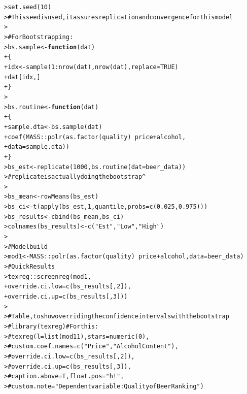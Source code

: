 \documentclass[12pt]{article}\usepackage[]{graphicx}\usepackage[]{color}
\makeatletter
\newcommand{\hlnum}[1]{\textcolor[rgb]{0.82,0.78,0.62}{#1}}%
\newcommand{\hlstr}[1]{\textcolor[rgb]{0.82,0.78,0.62}{#1}}%
\newcommand{\hlcom}[1]{\textcolor[rgb]{0.404,0.408,0.42}{#1}}%
\newcommand{\hlopt}[1]{\textcolor[rgb]{0.882,0.878,0.898}{#1}}%
\newcommand{\hlstd}[1]{\textcolor[rgb]{0.882,0.878,0.898}{#1}}%
\newcommand{\hlkwa}[1]{\textcolor[rgb]{0.384,0.675,0.808}{\textbf{#1}}}%
\newcommand{\hlkwb}[1]{\textcolor[rgb]{0.902,0.675,0.196}{#1}}%
\newcommand{\hlkwc}[1]{\textcolor[rgb]{0.812,0.522,0.388}{#1}}%
\newcommand{\hlkwd}[1]{\textcolor[rgb]{0.733,0.388,0.812}{#1}}%
\newenvironment{kframe}{%
 \def\at@end@of@kframe{}%
 \ifinner\ifhmode%
  \def\at@end@of@kframe{\end{minipage}}%
  \begin{minipage}{\columnwidth}%
 \fi\fi%
 \def\FrameCommand##1{\hskip\@totalleftmargin \hskip-\fboxsep
 \colorbox{shadecolor}{##1}\hskip-\fboxsep
     \hskip-\linewidth \hskip-\@totalleftmargin \hskip\columnwidth}%
 \MakeFramed {\advance\hsize-\width
   \@totalleftmargin\z@ \linewidth\hsize
   \@setminipage}}%
 {\par\unskip\endMakeFramed%
 \at@end@of@kframe}
\newenvironment{knitrout}{}{} %
\makeatother
\begin{document}
\begin{flushleft}
\begin{knitrout}
\color{fgcolor}\begin{kframe}
\begin{alltt}
\hlstd{> }\hlkwd{set.seed}\hlstd{(}\hlnum{10}\hlstd{)}
\hlstd{> }\hlcom{# This seed is used, it assures replication and convergence for this model}
\hlstd{> }
\hlstd{> }\hlcom{# For Bootstrapping:}
\hlstd{> }\hlstd{bs.sample} \hlkwb{<-} \hlkwa{function}\hlstd{(}\hlkwc{dat}\hlstd{)}
\hlstd{+ }\hlstd{\{}
\hlstd{+ }  \hlstd{idx} \hlkwb{<-} \hlkwd{sample}\hlstd{(}\hlnum{1}\hlopt{:}\hlkwd{nrow}\hlstd{(dat),} \hlkwd{nrow}\hlstd{(dat),} \hlkwc{replace} \hlstd{=} \hlnum{TRUE}\hlstd{)}
\hlstd{+ }  \hlstd{dat[idx,]}
\hlstd{+ }\hlstd{\}}
\hlstd{> }
\hlstd{> }\hlstd{bs.routine} \hlkwb{<-} \hlkwa{function}\hlstd{(}\hlkwc{dat}\hlstd{)}
\hlstd{+ }\hlstd{\{}
\hlstd{+ }  \hlstd{sample.dta} \hlkwb{<-} \hlkwd{bs.sample}\hlstd{(dat)}
\hlstd{+ }  \hlkwd{coef}\hlstd{(MASS}\hlopt{::}\hlkwd{polr}\hlstd{(}\hlkwd{as.factor}\hlstd{(quality)} \hlopt{~} \hlstd{price} \hlopt{+} \hlstd{alcohol,}
\hlstd{+ }                  \hlkwc{data} \hlstd{= sample.dta))}
\hlstd{+ }\hlstd{\}}
\hlstd{> }\hlstd{bs_est} \hlkwb{<-} \hlkwd{replicate}\hlstd{(}\hlnum{1000}\hlstd{,} \hlkwd{bs.routine}\hlstd{(}\hlkwc{dat} \hlstd{= beer_data))}
\hlstd{> }\hlcom{# replicate is actually doing the bootstrap^}
\hlstd{> }
\hlstd{> }\hlstd{bs_mean} \hlkwb{<-} \hlkwd{rowMeans}\hlstd{(bs_est)}
\hlstd{> }\hlstd{bs_ci} \hlkwb{<-} \hlkwd{t}\hlstd{(}\hlkwd{apply}\hlstd{(bs_est,} \hlnum{1}\hlstd{, quantile,} \hlkwc{probs} \hlstd{=} \hlkwd{c}\hlstd{(}\hlnum{0.025}\hlstd{,} \hlnum{0.975}\hlstd{)))}
\hlstd{> }\hlstd{bs_results} \hlkwb{<-} \hlkwd{cbind}\hlstd{(bs_mean, bs_ci)}
\hlstd{> }\hlkwd{colnames}\hlstd{(bs_results)} \hlkwb{<-} \hlkwd{c}\hlstd{(}\hlstr{"Est"}\hlstd{,} \hlstr{"Low"}\hlstd{,} \hlstr{"High"}\hlstd{)}
\hlstd{> }
\hlstd{> }\hlcom{# Model build}
\hlstd{> }\hlstd{mod1} \hlkwb{<-} \hlstd{MASS}\hlopt{::}\hlkwd{polr}\hlstd{(}\hlkwd{as.factor}\hlstd{(quality)} \hlopt{~} \hlstd{price} \hlopt{+} \hlstd{alcohol,} \hlkwc{data}\hlstd{=beer_data)}
\hlstd{> }\hlcom{# Quick Results}
\hlstd{> }\hlstd{texreg}\hlopt{::}\hlkwd{screenreg}\hlstd{(mod1,}
\hlstd{+ }                  \hlkwc{override.ci.low} \hlstd{=} \hlkwd{c}\hlstd{(bs_results[,} \hlnum{2}\hlstd{]),}
\hlstd{+ }                  \hlkwc{override.ci.up} \hlstd{=} \hlkwd{c}\hlstd{(bs_results[,} \hlnum{3}\hlstd{]))}
\hlstd{> }
\hlstd{> }\hlcom{# Table, to show overriding the confidence intervals with the bootstrap}
\hlstd{> }\hlcom{# library(texreg) # For this:}
\hlstd{> }\hlcom{# texreg(l= list(mod11), stars = numeric(0),}
\hlstd{> }\hlcom{#        custom.coef.names = c("Price", "Alcohol Content"),}
\hlstd{> }\hlcom{#        override.ci.low = c(bs_results[, 2]),}
\hlstd{> }\hlcom{#        override.ci.up = c(bs_results[, 3]),}
\hlstd{> }\hlcom{#        caption.above = T, float.pos = "h!",}
\hlstd{> }\hlcom{#        custom.note = "Dependent variable: Quality of Beer Ranking" )}
\end{alltt}
\end{kframe}
\end{knitrout}





\end{flushleft}
\end{document}
